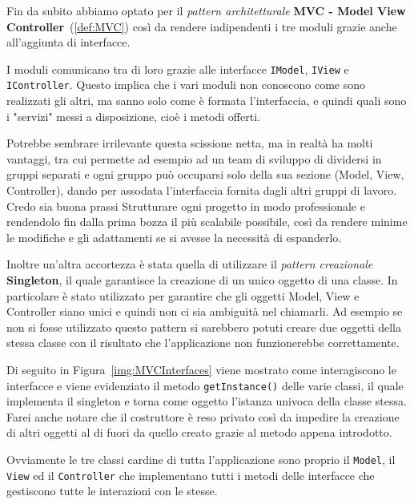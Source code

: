 		Fin da subito abbiamo optato per il \textit{pattern architetturale} \textbf{MVC - Model View Controller}~(\ref{def:MVC}) così da rendere indipendenti i tre moduli grazie anche all'aggiunta di interfacce.
		
		I moduli comunicano tra di loro grazie alle interfacce \verb|IModel|, \verb|IView| e \verb|IController|.
		Questo implica che i vari moduli non conoscono come sono realizzati gli altri, ma sanno solo come è formata l'interfaccia, e quindi quali sono i "servizi" messi a disposizione, cioè i metodi offerti.
		
		Potrebbe sembrare irrilevante questa scissione netta, ma in realtà ha molti vantaggi, tra cui permette ad esempio ad un team di sviluppo di dividersi in gruppi separati e ogni gruppo può occuparsi solo della sua sezione (Model, View, Controller), dando per assodata l'interfaccia fornita dagli altri gruppi di lavoro. Credo sia buona prassi Strutturare ogni progetto in modo professionale e rendendolo fin dalla prima bozza il più scalabile possibile, così da rendere minime le modifiche e gli adattamenti se si avesse la necessità di espanderlo.
		
		Inoltre un'altra accortezza è stata quella di utilizzare il \textit{pattern creazionale} \textbf{Singleton}, il quale garantisce la creazione di un unico oggetto di una classe. In particolare è stato utilizzato per garantire che gli oggetti Model, View e Controller siano unici e quindi non ci sia ambiguità nel chiamarli. Ad esempio se non si fosse utilizzato questo pattern si sarebbero potuti creare due oggetti della stessa classe con il risultato che l'applicazione non funzionerebbe correttamente.
		
		Di seguito in Figura~\ref{img:MVCInterfaces} viene mostrato come interagiscono le interfacce e viene evidenziato il metodo \texttt{getInstance()} delle varie classi, il quale implementa il singleton e torna come oggetto l'istanza univoca della classe stessa. Farei anche notare che il costruttore è reso privato così da impedire la creazione di altri oggetti al di fuori da quello creato grazie al metodo appena introdotto.
		
		\begin{center}
			\label{img:MVCInterfaces}
		\end{center}
		
		Ovviamente le tre classi cardine di tutta l'applicazione sono proprio il \verb|Model|, il \verb|View| ed il \verb|Controller| che implementano tutti i metodi delle interfacce che gestiscono tutte le interazioni con le stesse.
		
